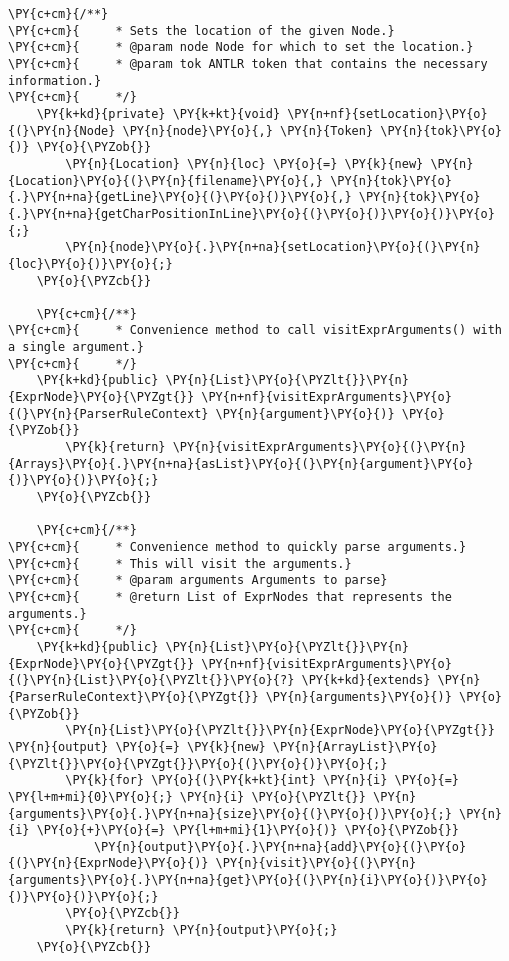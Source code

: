 \begin{Verbatim}[commandchars=\\\{\}]
    \PY{c+cm}{/**}
\PY{c+cm}{     * Sets the location of the given Node.}
\PY{c+cm}{     * @param node Node for which to set the location.}
\PY{c+cm}{     * @param tok ANTLR token that contains the necessary information.}
\PY{c+cm}{     */}
    \PY{k+kd}{private} \PY{k+kt}{void} \PY{n+nf}{setLocation}\PY{o}{(}\PY{n}{Node} \PY{n}{node}\PY{o}{,} \PY{n}{Token} \PY{n}{tok}\PY{o}{)} \PY{o}{\PYZob{}}
        \PY{n}{Location} \PY{n}{loc} \PY{o}{=} \PY{k}{new} \PY{n}{Location}\PY{o}{(}\PY{n}{filename}\PY{o}{,} \PY{n}{tok}\PY{o}{.}\PY{n+na}{getLine}\PY{o}{(}\PY{o}{)}\PY{o}{,} \PY{n}{tok}\PY{o}{.}\PY{n+na}{getCharPositionInLine}\PY{o}{(}\PY{o}{)}\PY{o}{)}\PY{o}{;}
        \PY{n}{node}\PY{o}{.}\PY{n+na}{setLocation}\PY{o}{(}\PY{n}{loc}\PY{o}{)}\PY{o}{;}
    \PY{o}{\PYZcb{}}

    \PY{c+cm}{/**}
\PY{c+cm}{     * Convenience method to call visitExprArguments() with a single argument.}
\PY{c+cm}{     */}
    \PY{k+kd}{public} \PY{n}{List}\PY{o}{\PYZlt{}}\PY{n}{ExprNode}\PY{o}{\PYZgt{}} \PY{n+nf}{visitExprArguments}\PY{o}{(}\PY{n}{ParserRuleContext} \PY{n}{argument}\PY{o}{)} \PY{o}{\PYZob{}}
        \PY{k}{return} \PY{n}{visitExprArguments}\PY{o}{(}\PY{n}{Arrays}\PY{o}{.}\PY{n+na}{asList}\PY{o}{(}\PY{n}{argument}\PY{o}{)}\PY{o}{)}\PY{o}{;}
    \PY{o}{\PYZcb{}}

    \PY{c+cm}{/**}
\PY{c+cm}{     * Convenience method to quickly parse arguments.}
\PY{c+cm}{     * This will visit the arguments.}
\PY{c+cm}{     * @param arguments Arguments to parse}
\PY{c+cm}{     * @return List of ExprNodes that represents the arguments.}
\PY{c+cm}{     */}
    \PY{k+kd}{public} \PY{n}{List}\PY{o}{\PYZlt{}}\PY{n}{ExprNode}\PY{o}{\PYZgt{}} \PY{n+nf}{visitExprArguments}\PY{o}{(}\PY{n}{List}\PY{o}{\PYZlt{}}\PY{o}{?} \PY{k+kd}{extends} \PY{n}{ParserRuleContext}\PY{o}{\PYZgt{}} \PY{n}{arguments}\PY{o}{)} \PY{o}{\PYZob{}}
        \PY{n}{List}\PY{o}{\PYZlt{}}\PY{n}{ExprNode}\PY{o}{\PYZgt{}} \PY{n}{output} \PY{o}{=} \PY{k}{new} \PY{n}{ArrayList}\PY{o}{\PYZlt{}}\PY{o}{\PYZgt{}}\PY{o}{(}\PY{o}{)}\PY{o}{;}
        \PY{k}{for} \PY{o}{(}\PY{k+kt}{int} \PY{n}{i} \PY{o}{=} \PY{l+m+mi}{0}\PY{o}{;} \PY{n}{i} \PY{o}{\PYZlt{}} \PY{n}{arguments}\PY{o}{.}\PY{n+na}{size}\PY{o}{(}\PY{o}{)}\PY{o}{;} \PY{n}{i} \PY{o}{+}\PY{o}{=} \PY{l+m+mi}{1}\PY{o}{)} \PY{o}{\PYZob{}}
            \PY{n}{output}\PY{o}{.}\PY{n+na}{add}\PY{o}{(}\PY{o}{(}\PY{n}{ExprNode}\PY{o}{)} \PY{n}{visit}\PY{o}{(}\PY{n}{arguments}\PY{o}{.}\PY{n+na}{get}\PY{o}{(}\PY{n}{i}\PY{o}{)}\PY{o}{)}\PY{o}{)}\PY{o}{;}
        \PY{o}{\PYZcb{}}
        \PY{k}{return} \PY{n}{output}\PY{o}{;}
    \PY{o}{\PYZcb{}}
    

\end{Verbatim}
